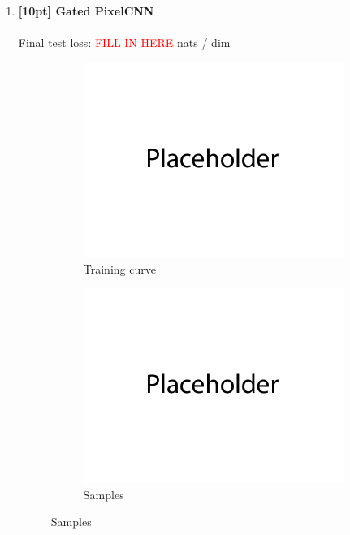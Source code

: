 \documentclass{article}
\begin{document}
\newpage
{}
\begin{enumerate}

\item {\bf [10pt] Gated PixelCNN} \\\\
Final test loss: \textcolor{red}{FILL IN HERE}  nats / dim
\begin{figure}[H]
    \centering
    \begin{subfigure}{0.45\textwidth}
        \centering
        \includegraphics[width=\textwidth]{figures/q4_a_train_plot.png}
        \caption{Training curve}
    \end{subfigure}
    \hspace{0.2in}
    \begin{subfigure}{0.45\textwidth}
        \centering
        \includegraphics[width=\textwidth]{figures/q4_a_samples.png}
        \caption{Samples}
    \end{subfigure}
\end{figure}


\end{enumerate}
\end{document}
